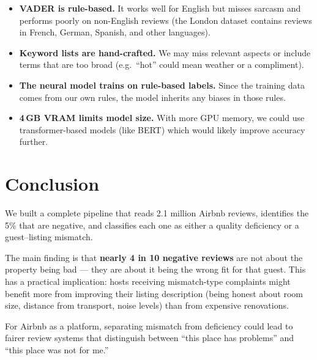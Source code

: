 \documentclass[12pt,a4paper]{article}
\begin{document}
\begin{itemize}[nosep]
    \item \textbf{VADER is rule-based.} It works well for English but misses sarcasm and performs poorly on non-English reviews (the London dataset contains reviews in French, German, Spanish, and other languages).
    \item \textbf{Keyword lists are hand-crafted.} We may miss relevant aspects or include terms that are too broad (e.g.\ ``hot'' could mean weather or a compliment).
    \item \textbf{The neural model trains on rule-based labels.} Since the training data comes from our own rules, the model inherits any biases in those rules.
    \item \textbf{4\,GB VRAM limits model size.} With more GPU memory, we could use transformer-based models (like BERT) which would likely improve accuracy further.
\end{itemize}

\section{Conclusion}

We built a complete pipeline that reads 2.1 million Airbnb reviews, identifies the 5\% that are negative, and classifies each one as either a quality deficiency or a guest--listing mismatch.

The main finding is that \textbf{nearly 4 in 10 negative reviews} are not about the property being bad --- they are about it being the wrong fit for that guest.
This has a practical implication: hosts receiving mismatch-type complaints might benefit more from improving their listing description (being honest about room size, distance from transport, noise levels) than from expensive renovations.

For Airbnb as a platform, separating mismatch from deficiency could lead to fairer review systems that distinguish between ``this place has problems'' and ``this place was not for me.''
\end{document}
